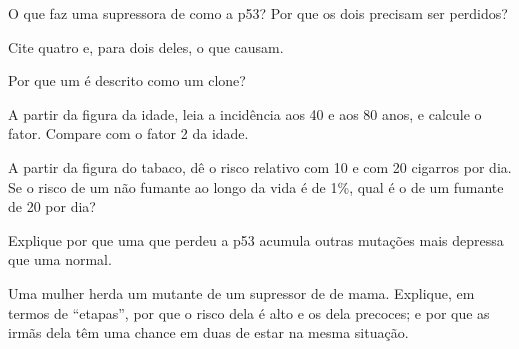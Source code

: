 \begin{exercise}[$\star$]\label{exo:g11:cancer:3}
O que faz uma  supressora de  como a p53? Por que os dois
 precisam ser perdidos?
\end{exercise}

\begin{exercise}[$\star$]\label{exo:g11:cancer:4}
Cite quatro  e, para dois deles, o  que causam.
\end{exercise}

\begin{exercise}[$\star$]\label{exo:g11:cancer:5}
Por que um  é descrito como um clone?
\end{exercise}

\begin{exercise}[$\star\star$]\label{exo:g11:cancer:6}
A partir da figura da idade, leia a incidência aos 40 e aos 80 anos, e
calcule o fator. Compare com o fator 2 da idade.
\end{exercise}

\begin{exercise}[$\star\star$]\label{exo:g11:cancer:7}
A partir da figura do tabaco, dê o risco relativo com 10 e com 20
cigarros por dia. Se o risco de um não fumante ao longo da vida é de
1\%, qual é o de um fumante de 20 por dia?
\end{exercise}

\begin{exercise}[$\star\star$]\label{exo:g11:cancer:8}
Explique por que uma  que perdeu a p53 acumula outras mutações
mais depressa que uma  normal.
\end{exercise}

\begin{exercise}[$\star\star$]\label{exo:g11:cancer:9}
Uma mulher herda um  mutante de um  supressor de  de
mama. Explique, em termos de ``etapas'', por que o risco dela é alto e
os  dela precoces; e por que as irmãs dela têm uma chance em
duas de estar na mesma situação.
\end{exercise}

